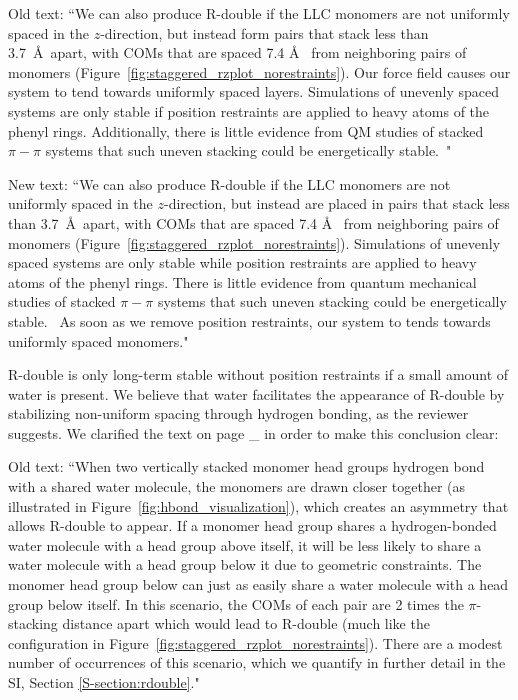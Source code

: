\documentclass{article}
\begin{document}
\begin{enumerate}
    Old text: ``We can also produce R-double if the LLC monomers are not
    uniformly spaced in the $z$-direction, but instead form pairs that stack less
    than 3.7~\AA~apart, with COMs that are spaced 7.4 \AA~ from neighboring pairs
    of monomers (Figure~\ref{fig:staggered_rzplot_norestraints}).  Our force field
    causes our system to tend towards uniformly spaced layers. Simulations of
    unevenly spaced systems are only stable if position restraints are applied to
    heavy atoms of the phenyl rings. Additionally, there is little evidence from QM
    studies of stacked $\pi-\pi$ systems that such uneven stacking could be
    energetically stable.~\cite{tauer_beyond_2005}"

    New text: ``We can also produce R-double if the LLC monomers are not
    uniformly spaced in the $z$-direction, but instead are placed in pairs that
    stack less than 3.7~\AA~apart, with COMs that are spaced 7.4 \AA~ from
    neighboring pairs of monomers (Figure~\ref{fig:staggered_rzplot_norestraints}).
    Simulations of unevenly spaced systems are only stable while position
    restraints are applied to heavy atoms of the phenyl rings. There is little
    evidence from quantum mechanical studies of stacked $\pi-\pi$ systems that such
    uneven stacking could be energetically stable.~\cite{tauer_beyond_2005} As soon
    as we remove position restraints, our system to tends towards uniformly spaced
    monomers."

    R-double is only long-term stable without position restraints if a small
    amount of water is present. We believe that water facilitates the appearance
    of R-double by stabilizing non-uniform spacing through hydrogen bonding, as the
    reviewer suggests. We clarified the text on page _ in order to make this 
    conclusion clear:

    Old text: ``When two vertically stacked monomer head groups hydrogen bond
    with a shared water molecule, the monomers are drawn closer together (as
    illustrated in Figure~\ref{fig:hbond_visualization}), which creates an
    asymmetry that allows R-double to appear. If a monomer head group shares a
    hydrogen-bonded water molecule with a head group above itself, it will be less
    likely to share a water molecule with a head group below it due to geometric
    constraints. The monomer head group below can just as easily share a water
    molecule with a head group below itself. In this scenario, the COMs of each
    pair are 2 times the $\pi$-stacking distance apart which would lead to R-double
    (much like the configuration in
     Figure~\ref{fig:staggered_rzplot_norestraints}). There are a modest number of
    occurrences of this scenario, which we quantify in further detail in the SI,
    Section \ref{S-section:rdouble}."


\end{enumerate}
\end{document}
